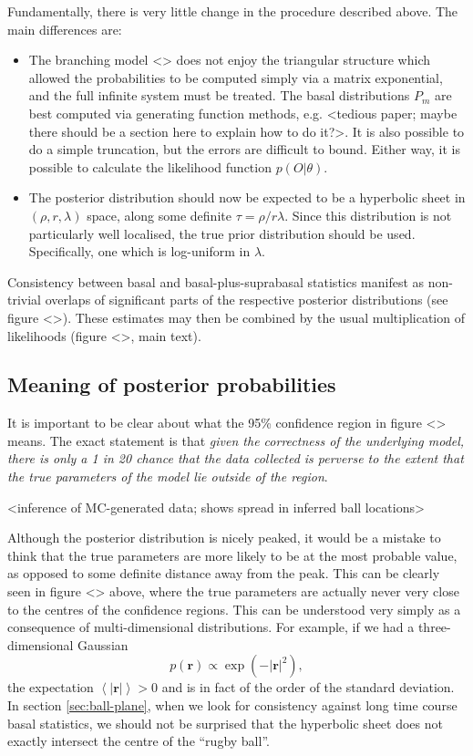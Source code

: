\documentclass[10pt,UKenglish]{article}
\begin{document}
Fundamentally, there is very little change in the procedure described above. The main differences are:

\begin{itemize}
\item The branching model <> does not enjoy the triangular structure which allowed the probabilities to be computed simply via a matrix exponential, and the full infinite system must be treated. The basal distributions $P_m$ are best computed via generating function methods, e.g. <tedious paper; maybe there should be a section here to explain how to do it?>. It is also possible to do a simple truncation, but the errors are difficult to bound. Either way, it is possible to calculate the likelihood function $p(O|\theta)$.
\item The posterior distribution should now be expected to be a hyperbolic sheet in $(\rho, r, \lambda)$ space, along some definite $\tau = \rho/r\lambda$. Since this distribution is not particularly well localised, the true prior distribution should be used. Specifically, one which is log-uniform in $\lambda$.
\end{itemize}

Consistency between basal and basal-plus-suprabasal statistics manifest as non-trivial overlaps of significant parts of the respective posterior distributions (see figure <>). These estimates may then be combined by the usual multiplication of likelihoods (figure <>, main text).

\subsection{Meaning of posterior probabilities}

It is important to be clear about what the 95\% confidence region in figure <> means. The exact statement is that \emph{given the correctness of the underlying model, there is only a 1 in 20 chance that the data collected is perverse to the extent that the true parameters of the model lie outside of the region}.

<inference of MC-generated data; shows spread in inferred ball locations>

Although the posterior distribution is nicely peaked, it would be a mistake to think that the true parameters are more likely to be at the most probable value, as opposed to some definite distance away from the peak. This can be clearly seen in figure <> above, where the true parameters are actually never very close to the centres of the confidence regions. This can be understood very simply as a consequence of multi-dimensional distributions. For example, if we had a three-dimensional Gaussian $$p(\mathbf{r}) \propto \exp\left(-|\mathbf r|^2\right),$$ the expectation $\left\langle \mathbf |\mathbf r| \right\rangle > 0$ and is in fact of the order of the standard deviation. In section \ref{sec:ball-plane}, when we look for consistency against long time course basal statistics, we should not be surprised that the hyperbolic sheet does not exactly intersect the centre of the ``rugby ball''.
\end{document}
